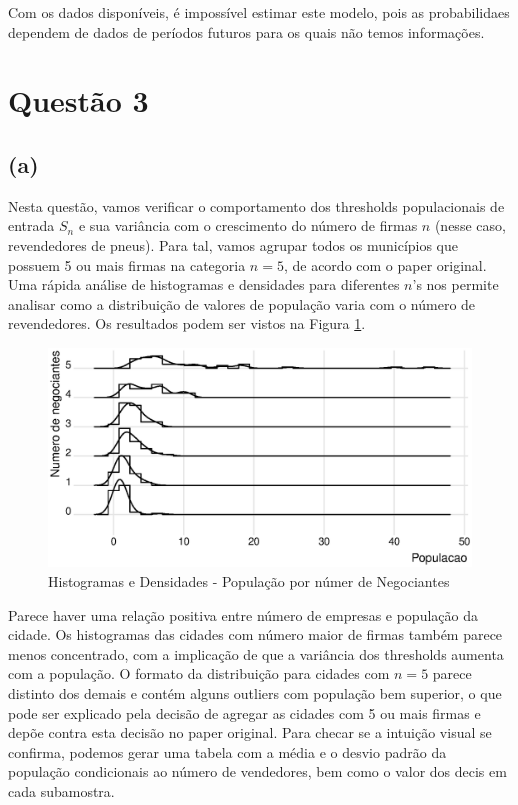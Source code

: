 \documentclass{article}
\begin{document}
Com os dados disponíveis, é impossível estimar este modelo, pois as probabilidaes dependem de dados de períodos futuros para os quais não temos informações.

\section*{Questão 3}

\subsection*{(a)}

Nesta questão, vamos verificar o comportamento dos thresholds populacionais de entrada $S_n$ e sua variância com o crescimento do número de firmas $n$ (nesse caso, revendedores de pneus). Para tal, vamos agrupar todos os municípios que possuem 5 ou mais firmas na categoria $n = 5$, de acordo com o paper original. Uma rápida análise de histogramas e densidades para diferentes $n$'s nos permite analisar como a distribuição de valores de população varia com o número de revendedores. Os resultados podem ser vistos na Figura \ref{fig 1}.

\begin{figure}[H]
    \centering
    \includegraphics[width=\textwidth]{figs and tabs/histbres2.eps}
    \caption{Histogramas e Densidades - População por númer de Negociantes}
    \label{fig 1}
\end{figure}

Parece haver uma relação positiva entre número de empresas e população da cidade. Os histogramas das cidades com número maior de firmas também parece menos concentrado, com a implicação de que a variância dos thresholds aumenta com a população. O formato da distribuição para cidades com $n = 5$ parece distinto dos demais e contém alguns outliers com população bem superior, o que pode ser explicado pela decisão de agregar as cidades com 5 ou mais firmas e depõe contra esta decisão no paper original. Para checar se a intuição visual se confirma, podemos gerar uma tabela com a média e o desvio padrão da população condicionais ao número de vendedores, bem como o valor dos decis em cada subamostra.
\end{document}
